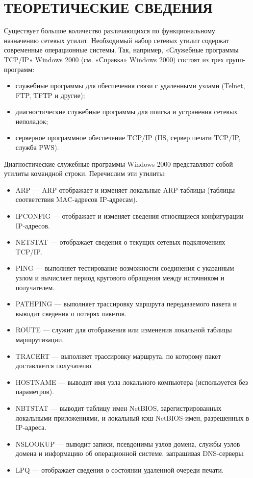 \section{ТЕОРЕТИЧЕСКИЕ СВЕДЕНИЯ}
\label{sec:theory}

Существует большое количество различающихся по функциональному назначению сетевых утилит.
Необходимый набор сетевых утилит содержат современные операционные системы.
Так, например, «Служебные программы TCP/IP» Windows 2000
(см. «Справка» Windows 2000) состоят из трех групп-программ:
\begin{itemize}
\item служебные программы для обеспечения связи с удаленными узлами (Telnet, FTP, TFTP  и другие);
\item диагностические служебные программы для поиска и устранения сетевых неполадок;
\item серверное программное обеспечение TCP/IP (IIS, сервер печати TCP/IP, служба PWS).
\end{itemize}

Диагностические служебные программы Windows 2000 представляют собой утилиты командной строки.
Перечислим эти утилиты:
\begin{itemize}

\item ARP --- ARP отображает и изменяет локальные ARP-таблицы (таблицы соответствия MAC-адресов IP-адресам).

\item IPCONFIG --- отображает и изменяет сведения относящиеся конфигурации IP-адресов.
\item NETSTAT --- отображает сведения о текущих сетевых подключениях TCP/IP.
\item PING --- выполняет тестирование возможности соединения с указанным
    узлом и вычисляет период кругового обращения между источником и получателем.
\item PATHPING --- выполняет трассировку маршрута передаваемого пакета и выводит сведения о потерях пакетов.
\item ROUTE --- служит для отображения или изменения локальной таблицы маршрутизации.
\item TRACERT --- выполняет трассировку маршрута, по которому пакет доставляется получателю.
\item HOSTNAME --- выводит имя узла локального компьютера (используется без параметров).
\item NBTSTAT --- выводит таблицу имен NetBIOS, зарегистрированных локальными приложениями,
    и локальный кэш NetBIOS-имен, разрешенных в IP-адреса.
\item NSLOOKUP --- выводит записи, псевдонимы узлов домена,
    службы узлов домена и информацию об операционной системе, запрашивая DNS-серверы.
\item LPQ --- отображает сведения о состоянии удаленной очереди печати.

\end{itemize}

